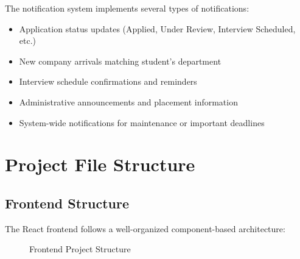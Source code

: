 \documentclass[12pt,a4paper]{report}
\begin{document}
The notification system implements several types of notifications:
\begin{itemize}
    \item Application status updates (Applied, Under Review, Interview Scheduled, etc.)
    \item New company arrivals matching student's department
    \item Interview schedule confirmations and reminders
    \item Administrative announcements and placement information
    \item System-wide notifications for maintenance or important deadlines
\end{itemize}

\chapter{Project File Structure}

\section{Frontend Structure}
The React frontend follows a well-organized component-based architecture:

\begin{figure}[H]
    \centering
    \caption{Frontend Project Structure}
    \label{fig:frontend-structure}
\end{figure}
\end{document}
